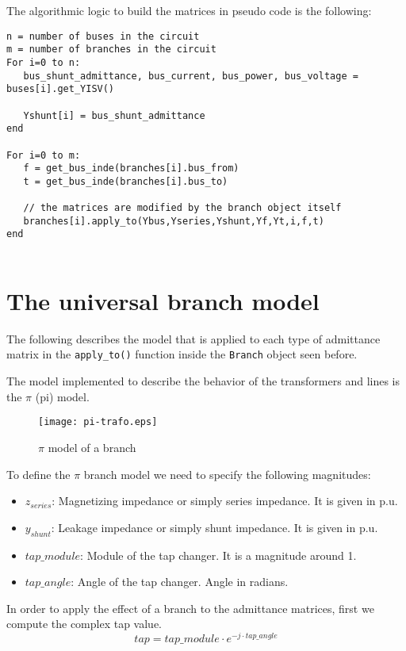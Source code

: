 \documentclass[11pt,fleqn]{book} %
\begin{document}
The algorithmic logic to build the matrices in pseudo code is the following:

\begin{verbatim}
n = number of buses in the circuit
m = number of branches in the circuit
For i=0 to n:
   bus_shunt_admittance, bus_current, bus_power, bus_voltage = buses[i].get_YISV()
   
   Yshunt[i] = bus_shunt_admittance
end

For i=0 to m:
   f = get_bus_inde(branches[i].bus_from)
   t = get_bus_inde(branches[i].bus_to)
   
   // the matrices are modified by the branch object itself
   branches[i].apply_to(Ybus,Yseries,Yshunt,Yf,Yt,i,f,t)
end
	
\end{verbatim}

\section{The universal branch model}

The following describes the model that is applied to each type of admittance matrix in the \verb|apply_to()| function inside the \verb|Branch| object seen before.

The model implemented to describe the behavior of the transformers and lines is the $\pi$ (pi) model.
\begin{figure}[h]
	\centering\texttt{[image: pi-trafo.eps]}
	\caption{$\pi$ model of a branch}
	\label{trafo pi model}
\end{figure}

To define the $\pi$ branch model we need to specify the following magnitudes:

\begin{itemize}
	\item $z_{series}$: Magnetizing impedance or simply series impedance. It is given in p.u.
	\item $y_{shunt}$: Leakage impedance or simply shunt impedance. It is given in p.u.
	\item $tap\_module$: Module of the tap changer. It is a magnitude around 1.
	\item $tap\_angle$: Angle of the tap changer. Angle in radians.\newline
\end{itemize}



In order to apply the effect of a branch to the admittance matrices, first we compute the complex tap value.
$$tap = tap\_module \cdot e^{-j \cdot tap\_angle}$$  
\end{document}
